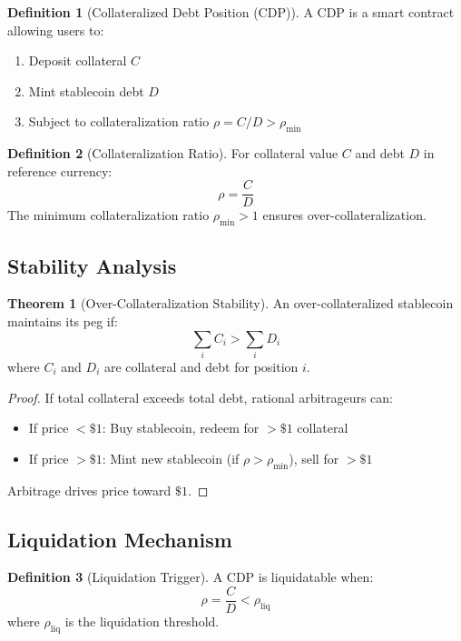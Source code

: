 \documentclass[11pt,a4paper]{article}
\theoremstyle{definition}
\newtheorem{definition}{Definition}
\newtheorem{theorem}{Theorem}
\begin{document}
\begin{definition}[Collateralized Debt Position (CDP)]
A CDP is a smart contract allowing users to:
\begin{enumerate}
\item Deposit collateral $C$
\item Mint stablecoin debt $D$
\item Subject to collateralization ratio $\rho = C/D > \rho_{\min}$
\end{enumerate}
\end{definition}

\begin{definition}[Collateralization Ratio]
For collateral value $C$ and debt $D$ in reference currency:
\begin{equation}
\rho = \frac{C}{D}
\end{equation}
The minimum collateralization ratio $\rho_{\min} > 1$ ensures over-collateralization.
\end{definition}

\subsection{Stability Analysis}

\begin{theorem}[Over-Collateralization Stability]
An over-collateralized stablecoin maintains its peg if:
\begin{equation}
\sum_i C_i > \sum_i D_i
\end{equation}
where $C_i$ and $D_i$ are collateral and debt for position $i$.
\end{theorem}

\begin{proof}
If total collateral exceeds total debt, rational arbitrageurs can:
\begin{itemize}
\item If price $< \$1$: Buy stablecoin, redeem for $>\$1$ collateral
\item If price $> \$1$: Mint new stablecoin (if $\rho > \rho_{\min}$), sell for $>\$1$
\end{itemize}
Arbitrage drives price toward $\$1$.
\end{proof}

\subsection{Liquidation Mechanism}

\begin{definition}[Liquidation Trigger]
A CDP is liquidatable when:
\begin{equation}
\rho = \frac{C}{D} < \rho_{\text{liq}}
\end{equation}
where $\rho_{\text{liq}}$ is the liquidation threshold.
\end{definition}
\end{document}
